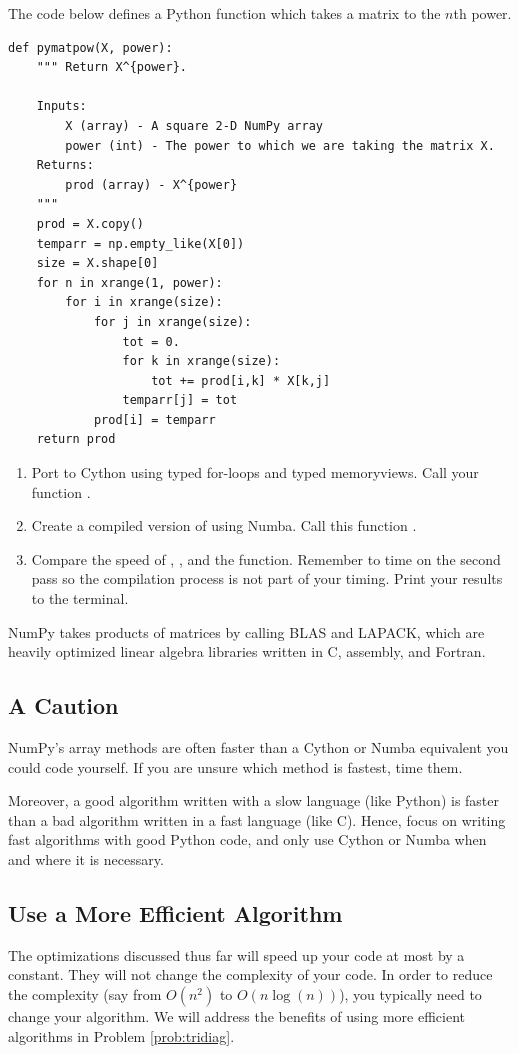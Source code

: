 \begin{problem}
The code below defines a Python function which takes a matrix to the $n$th power.
\begin{lstlisting}
def pymatpow(X, power):
    """ Return X^{power}.
    
    Inputs:
        X (array) - A square 2-D NumPy array
        power (int) - The power to which we are taking the matrix X.
    Returns:
        prod (array) - X^{power}
    """
    prod = X.copy()
    temparr = np.empty_like(X[0])
    size = X.shape[0]
    for n in xrange(1, power):
        for i in xrange(size):
            for j in xrange(size):
                tot = 0.
                for k in xrange(size):
                    tot += prod[i,k] * X[k,j]
                temparr[j] = tot
            prod[i] = temparr
    return prod
\end{lstlisting}

\begin{enumerate}
\item Port  to Cython using typed for-loops and typed memoryviews. Call your function .
\item Create a compiled version of  using Numba. Call this function .
\item Compare the speed of , ,  and the  function. Remember to time  on the second pass so the compilation process is not part of your timing. Print your results to the terminal.
\end{enumerate}
NumPy takes products of matrices by calling BLAS and LAPACK, which are heavily optimized linear algebra libraries written in C, assembly, and Fortran.
\end{problem}

\subsection*{A Caution}
NumPy's array methods are often faster than a Cython or Numba equivalent you could code yourself.
If you are unsure which method is fastest, time them.

Moreover, a good algorithm written with a slow language (like Python) is faster than a bad algorithm written in a fast language (like C).
Hence, focus on writing fast algorithms with good Python code, and only use Cython  or Numba when and where it is necessary.

\subsection*{Use a More Efficient Algorithm}
The optimizations discussed thus far will speed up your code at most by a constant.
They will not change the complexity of your code.
In order to reduce the complexity (say from $O(n^2)$ to $O(n \log(n))$), you typically need to change your algorithm.
We will address the benefits of using more efficient algorithms in Problem \ref{prob:tridiag}.

